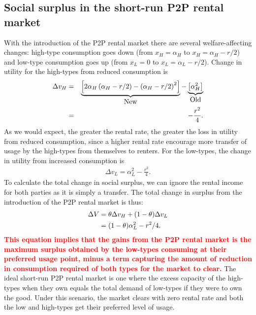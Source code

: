 \documentclass[11pt]{article}
\newcommand{\important}[1]{\textcolor{red}{\textbf{#1}}}
\newcommand{\important}[1]{#1}
\begin{document}
\subsection{Social surplus in the short-run P2P rental market} 
With the introduction of the P2P rental market there are several welfare-affecting changes: 
high-type consumption goes down (from $x_H = \alpha_H$ to  $x_H = \alpha_H - r/2$) and low-type consumption goes up (from $x_L = 0$ to $x_L = \alpha_L - r/2$). 
Change in utility for the high-types from reduced consumption is 
\begin{eqnarray}
\Delta v_H &=& \underbrace{\left[2 \alpha_H \left(\alpha_H - r/2\right) - \left(\alpha_H - r/2\right)^2 \right]}_{\mbox{New}} - 
                             \underbrace{\left[\alpha_H^2 \right]}_{\mbox{Old}}   \notag \\
           &=& - \frac{r^2}{4}. 
\end{eqnarray} 
As we would expect, the greater the rental rate, the greater the loss in utility from reduced consumption, since a higher rental rate encourage more transfer of usage by the high-types from themselves to renters. 
For the low-types, the change in utility from increased consumption is
\begin{align}
\Delta v_L = \alpha_L^2 - \frac{r^2}{4}. 
\end{align} 
To calculate the total change in social surplus, we can ignore the rental income for both parties as it is simply a transfer. 
The total change in surplus from the introduction of the P2P rental market is thus: 
\begin{align}
\Delta V &= \theta \Delta v_H + (1-\theta) \Delta v_L \notag \\ 
         & = (1-\theta) \alpha_L^2 - r^2/4.
\end{align}
\important{This equation implies that the gains from the P2P rental market is the maximum surplus obtained by the low-types consuming at their preferred usage point, minus a term capturing the amount of reduction in consumption required of both types for the market to clear.}  
The ideal short-run P2P rental market is one where the excess capacity of the high-types when they own equals the total demand of low-types if they were to own the good.
Under this scenario, the market clears with zero rental rate and both the low and high-types get their preferred level of usage. 
\end{document}
